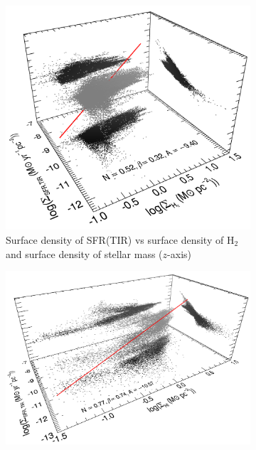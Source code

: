 {\begin{figure}
    \centering
    \begin{subfigure}[b]{0.5\textwidth}
        \centering
        \includegraphics[width=\textwidth]{../image_paper1/es_tot_fir_vs_h2.png}
        \caption{Surface density of SFR(TIR) vs surface density of H$_2$ and surface density of stellar mass ($z$-axis) }
        \label{fig:es,all,fir,h2}
    \end{subfigure}
    \hfill
    \begin{subfigure}[b]{0.5\textwidth}
        \centering
        \includegraphics[width=\textwidth]{../image_paper1/es_tot_fir_vs_hi2.png}

\end{subfigure}
\end{figure}}
